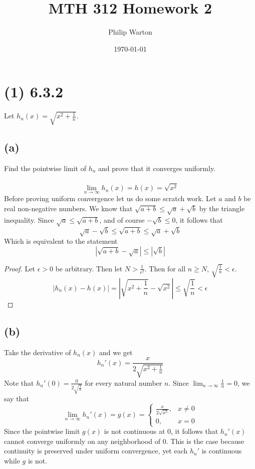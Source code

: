 \documentclass{article}
\begin{document}
\title{MTH 312 Homework 2}
\author{Philip Warton}
\date{\today}
\maketitle

\section*{(1) 6.3.2}
Let $h_n(x) = \sqrt{x^2 + \frac{1}{n}}$.
\subsection*{(a)}
Find the pointwise limit of $h_n$ and prove that it converges uniformly.
\\\\
\[ \lim_{n \rightarrow \infty} h_n(x) = h(x) = \sqrt{x^2} \]
Before proving uniform convergence let us do some scratch work.
Let $a$ and $b$ be real non-negative numbers.
We know that $\sqrt{a + b} \leqslant \sqrt{a} + \sqrt{b}$ by the triangle inequality.
Since $\sqrt{a} \leqslant \sqrt{a + b}$, and of course $-\sqrt{b} \leqslant 0$, it follows that
\[ \sqrt{a} - \sqrt{b} \leqslant \sqrt{a+b} \leqslant \sqrt{a} + \sqrt{b} \]
Which is equivalent to the statement 
\[ \left|\sqrt{a+b} -\sqrt{a}\right| \leqslant \left|\sqrt{b}\right|\]
\begin{proof}
    Let $\epsilon > 0$ be arbitrary.
    Then let $N > \frac{1}{\epsilon^2}$.
    Then for all $n \geqslant N$, $\sqrt{\frac{1}{n}} < \epsilon$.
    \[ |h_n(x) - h(x)| = \left|\sqrt{x^2 + \frac{1}{n}} - \sqrt{x^2}\right| \leqslant \sqrt{\frac{1}{n}} < \epsilon\]
\end{proof}
\subsection*{(b)}
Take the derivative of $h_n(x)$ and we get
\[ h_n'(x) = \frac{x}{2\sqrt{x^2+\frac{1}{n}}} \]
Note that $h_n'(0) = \frac{0}{2\sqrt{\frac{1}{n}}}$ for every natural number $n$.
Since $\lim_{n \rightarrow \infty} \frac{1}{n} = 0$, we say that
\[\lim_{n \rightarrow \infty}h_n'(x) = g(x) = \begin{cases}
    \frac{x}{2\sqrt{x^2}}, & x \neq 0 \\
    0, & x = 0
\end{cases}\]
Since the pointwise limit $g(x)$ is not continuous at 0, it follows that $h_n'(x)$ cannot converge uniformly on any neighborhood of 0.
This is the case because continuity is preserved under uniform convergence, yet each $h_n'$ is continuous while $g$ is not.
\end{document}
